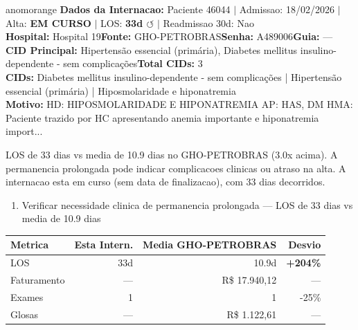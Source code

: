 \documentclass[a4paper,10pt]{article}
\begin{document}
\begin{anomalycard}[Internacao 165832 | GHO-PETROBRAS | ALTO (z=3.30)]{anomorange}
\textbf{Dados da Internacao:} Paciente 46044 $\mid$ Admissao: 18/02/2026 $\mid$ Alta: \textcolor{anomorange}{\textbf{EM CURSO}} $\mid$ LOS: \textbf{33d \textcolor{anomorange}{$\circlearrowleft$}} $\mid$ Readmissao 30d: Nao\\
\textbf{Hospital:} Hospital 19\quad\textbf{Fonte:} GHO-PETROBRAS\quad\textbf{Senha:} A489006\quad\textbf{Guia:} ---\\
\textbf{CID Principal:} {\small Hipertensão essencial (primária), Diabetes mellitus insulino-dependente - sem complicações}\quad\textbf{Total CIDs:} 3\\

\textbf{CIDs:} {\scriptsize Diabetes mellitus insulino-dependente - sem complicações | Hipertensão essencial (primária) | Hiposmolaridade e hiponatremia}\\

\textbf{Motivo:} {\scriptsize HD: HIPOSMOLARIDADE E HIPONATREMIA AP: HAS, DM HMA: Paciente trazido por HC apresentando anemia importante e hiponatremia import...}\\

\vspace{2pt}\begin{tcolorbox}[colback=severityred!20,colframe=anomorange,title={\textbf{Interpretacao de Negocio}},fonttitle=\bfseries\small,left=4pt,right=4pt,top=3pt,bottom=3pt]
{\small LOS de 33 dias vs media de 10.9 dias no GHO-PETROBRAS (3.0x acima). A permanencia prolongada pode indicar complicacoes clinicas ou atraso na alta. A internacao esta em curso (sem data de finalizacao), com 33 dias decorridos.}
\end{tcolorbox}
\begin{tcolorbox}[colback=severityyellow!30,colframe=anomorange,title={\textbf{Recomendacoes Especificas}},fonttitle=\bfseries\small,left=4pt,right=4pt,top=3pt,bottom=3pt]
\begin{enumerate}[nosep,leftmargin=16pt]
\item {\small Verificar necessidade clinica de permanencia prolongada --- LOS de 33 dias vs media de 10.9 dias}
\end{enumerate}
\end{tcolorbox}
\begin{center}\begin{tabular}{l r r r}\toprule\textbf{Metrica} & \textbf{Esta Intern.} & \textbf{Media GHO-PETROBRAS} & \textbf{Desvio} \\\midrule
LOS & 33d & 10.9d & \textcolor{anomred}{\textbf{+204\%}} \\
Faturamento & --- & R\$ 17.940,12 & --- \\
Exames & 1 & 1 & -25\% \\
Glosas & --- & R\$ 1.122,61 & --- \\
\bottomrule\end{tabular}\end{center}


\end{anomalycard}
\end{document}
